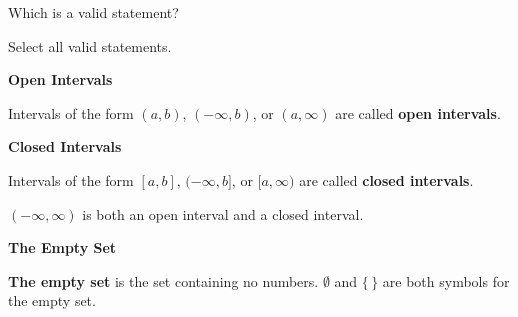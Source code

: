 \documentclass{ximera}
\begin{document}
\begin{question}
Which is a valid statement?
    \begin{multipleChoice}
    \choice {$3 \notin [1, \infty]$}
    \choice [correct]{$-3 \notin [1, \infty)$}
    \end{multipleChoice}
\end{question}



\begin{question}
Select all valid statements.
    \begin{selectAll}
    \choice {$4 \in [-3, -5]$}
    \choice [correct]{$4 \in [1, 8)$}
    \choice [correct]{$5 \notin (-\infty, -4]$}
    \choice {$0 \notin [-\infty, 7)$}
    \choice [correct]{$0 \in (-1, 2]$}
    \choice {$0 \in [6, 2]$}
    \end{selectAll}
\end{question}








\begin{definition} \textbf{\textcolor{green!50!black}{Open Intervals}}

Intervals of the form $(a, b)$, $(-\infty, b)$, or $(a, \infty)$ are called \textbf{open intervals}.

\end{definition}



\begin{definition} \textbf{\textcolor{green!50!black}{Closed Intervals}}

Intervals of the form $[a, b]$, $(-\infty, b]$, or $[a, \infty)$ are called \textbf{closed intervals}.

\end{definition}




\begin{warning}

$(-\infty, \infty)$ is both an open interval and a closed interval.


\end{warning}




\begin{definition} \textbf{\textcolor{green!50!black}{The Empty Set}}

\textbf{The empty set} is the set containing no numbers.  $\emptyset$ and $\{  \, \}$ are both symbols for the empty set.

\end{definition}
\end{document}
